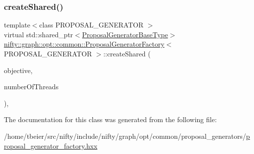 \subsubsection{\texorpdfstring{create\+Shared()}{createShared()}}
{\footnotesize\ttfamily template$<$class P\+R\+O\+P\+O\+S\+A\+L\+\_\+\+G\+E\+N\+E\+R\+A\+T\+OR $>$ \\
virtual std\+::shared\+\_\+ptr$<$\hyperlink{classnifty_1_1graph_1_1opt_1_1common_1_1ProposalGeneratorFactory_a44d8ba36c8096a6d2a1ed52c7546c5e4}{Proposal\+Generator\+Base\+Type}$>$ \hyperlink{classnifty_1_1graph_1_1opt_1_1common_1_1ProposalGeneratorFactory}{nifty\+::graph\+::opt\+::common\+::\+Proposal\+Generator\+Factory}$<$ P\+R\+O\+P\+O\+S\+A\+L\+\_\+\+G\+E\+N\+E\+R\+A\+T\+OR $>$\+::create\+Shared (\begin{DoxyParamCaption}\item[{const \hyperlink{classnifty_1_1graph_1_1opt_1_1common_1_1ProposalGeneratorFactory_ab9224ebe876fdeb13dcd4d3db9758280}{Objective\+Type} \&}]{objective,  }\item[{const size\+\_\+t}]{number\+Of\+Threads }\end{DoxyParamCaption})\hspace{0.3cm}{\ttfamily [inline]}, {\ttfamily [virtual]}}



The documentation for this class was generated from the following file\+:\begin{DoxyCompactItemize}
\item 
/home/tbeier/src/nifty/include/nifty/graph/opt/common/proposal\+\_\+generators/\hyperlink{common_2proposal__generators_2proposal__generator__factory_8hxx}{proposal\+\_\+generator\+\_\+factory.\+hxx}\end{DoxyCompactItemize}
